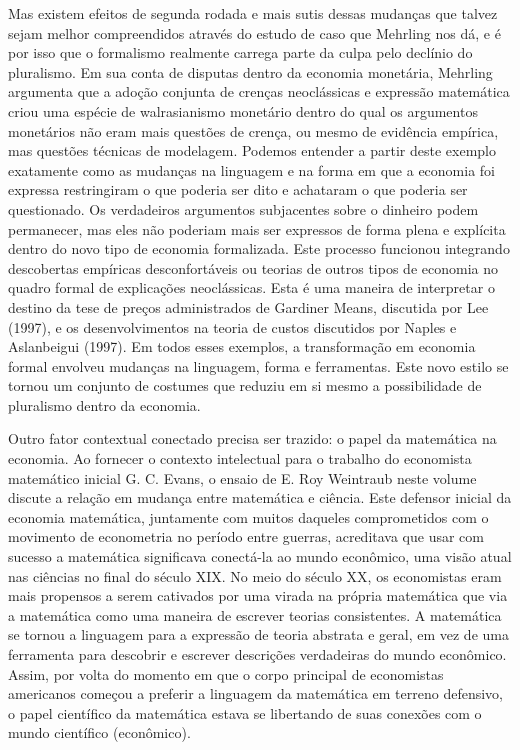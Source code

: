 \documentclass[a4paper,12pt]{article}[abntex2]
\begin{document}
Mas existem efeitos de segunda rodada e mais sutis dessas mudanças que talvez sejam melhor compreendidos através do estudo de caso que Mehrling nos dá, e é por isso que o formalismo realmente carrega parte da culpa pelo declínio do pluralismo. Em sua conta de disputas dentro da economia monetária, Mehrling argumenta que a adoção conjunta de crenças neoclássicas e expressão matemática criou uma espécie de walrasianismo monetário dentro do qual os argumentos monetários não eram mais questões de crença, ou mesmo de evidência empírica, mas questões técnicas de modelagem. Podemos entender a partir deste exemplo exatamente como as mudanças na linguagem e na forma em que a economia foi expressa restringiram o que poderia ser dito e achataram o que poderia ser questionado. Os verdadeiros argumentos subjacentes sobre o dinheiro podem permanecer, mas eles não poderiam mais ser expressos de forma plena e explícita dentro do novo tipo de economia formalizada. Este processo funcionou integrando descobertas empíricas desconfortáveis ou teorias de outros tipos de economia no quadro formal de explicações neoclássicas. Esta é uma maneira de interpretar o destino da tese de preços administrados de Gardiner Means, discutida por Lee (1997), e os desenvolvimentos na teoria de custos discutidos por Naples e Aslanbeigui (1997). Em todos esses exemplos, a transformação em economia formal envolveu mudanças na linguagem, forma e ferramentas. Este novo estilo se tornou um conjunto de costumes que reduziu em si mesmo a possibilidade de pluralismo dentro da economia.

Outro fator contextual conectado precisa ser trazido: o papel da matemática na economia. Ao fornecer o contexto intelectual para o trabalho do economista matemático inicial G. C. Evans, o ensaio de E. Roy Weintraub neste volume discute a relação em mudança entre matemática e ciência. Este defensor inicial da economia matemática, juntamente com muitos daqueles comprometidos com o movimento de econometria no período entre guerras, acreditava que usar com sucesso a matemática significava conectá-la ao mundo econômico, uma visão atual nas ciências no final do século XIX. No meio do século XX, os economistas eram mais propensos a serem cativados por uma virada na própria matemática que via a matemática como uma maneira de escrever teorias consistentes. A matemática se tornou a linguagem para a expressão de teoria abstrata e geral, em vez de uma ferramenta para descobrir e escrever descrições verdadeiras do mundo econômico. Assim, por volta do momento em que o corpo principal de economistas americanos começou a preferir a linguagem da matemática em terreno defensivo, o papel científico da matemática estava se libertando de suas conexões com o mundo científico (econômico).
\end{document}
